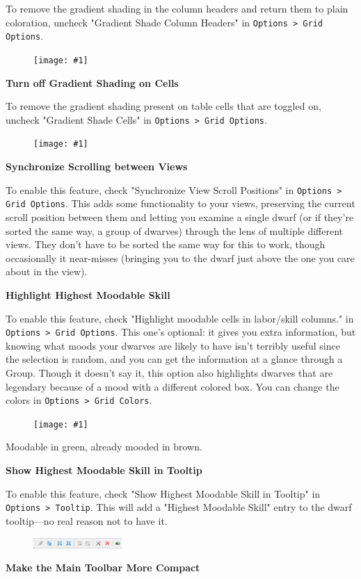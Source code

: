 \documentclass[]{article}
\newcommand{\fullfigure}[1] {
\begin{figure}[h!]
\texttt{[image: \#1]}
\end{figure}
}
\newcommand{\fullfigurecaption}[1] {
\begin{center}
\vspace{-12pt}
#1
\end{center}
}
\begin{document}
To remove the gradient shading in the column headers and return them to plain coloration, uncheck
"Gradient Shade Column Headers" in \texttt{Options > Grid Options}.

\fullfigure{Sec2Fig20}

\noindent \textbf{Turn off Gradient Shading on Cells}

To remove the gradient shading present on table cells that are toggled on, uncheck "Gradient Shade Cells"
in \texttt{Options > Grid Options}.

\fullfigure{Sec2Fig21}

\noindent \textbf{Synchronize Scrolling between Views}

To enable this feature, check "Synchronize View Scroll Positions" in \texttt{Options > Grid Options}.
This adds some functionality to your views, preserving the current scroll position between them and
letting you examine a single dwarf (or if they're sorted the same way, a group of dwarves) through the
lens of multiple different views. They don't have to be sorted the same way for this to work, though
occasionally it near-misses (bringing you to the dwarf just above the one you care about in the view).
\vspace{12pt}

\noindent \textbf{Highlight Highest Moodable Skill}

To enable this feature, check "Highlight moodable cells in labor/skill columns." in \texttt{Options >
Grid Options}. This one's optional: it gives you extra information, but knowing what moods your dwarves
are likely to have isn't terribly useful since the selection is random, and you can get the information
at a glance through a Group. Though it doesn't say it, this option also highlights dwarves that are
legendary because of a mood with a different colored box. You can change the colors in \texttt{Options >
Grid Colors}.

\fullfigure{Sec2Fig22}
\fullfigurecaption{Moodable in green, already mooded in brown.}

\noindent \textbf{Show Highest Moodable Skill in Tooltip}

To enable this feature, check "Show Highest Moodable Skill in Tooltip" in \texttt{Options > Tooltip}.
This will add a "Highest Moodable Skill" entry to the dwarf tooltip---no real reason not to have it.
\vspace{12pt}

\begin{figure}
\vspace{-5pt}
  \begin{center}
    \includegraphics[width=0.3\textwidth]{Sec2Fig23}
  \end{center}
\vspace{-10pt}
\end{figure}
\noindent \textbf{Make the Main Toolbar More Compact}
\end{document}
